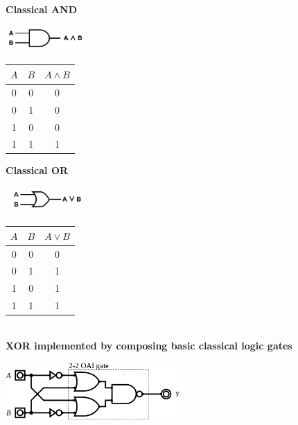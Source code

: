 \documentclass[conference]{IEEEtran}
\begin{document}
\begin{appendices}
\textbf{Classical AND}


\centerline{
    \includegraphics[width=0.225\textwidth]{img/classical-and-gate.png}
}
\label{fig:classicalAnd}

\begin{center}
\begin{tabular}{|c|c|c|}
    \hline
    $A$ & $B$ & $A \land B$ \\
    \hline
    0 & 0 & 0 \\
    0 & 1 & 0 \\
    1 & 0 & 0 \\
    1 & 1 & 1 \\
    \hline
\end{tabular}
\end{center}


\textbf{Classical OR}


\centerline{
    \includegraphics[width=0.225\textwidth]{img/classical-or-gate.png}
}
\label{fig:classicalOr}

\begin{center}
\begin{tabular}{|c|c|c|}
    \hline
    $A$ & $B$ & $A \lor B$ \\
    \hline
    0 & 0 & 0 \\
    0 & 1 & 1 \\
    1 & 0 & 1 \\
    1 & 1 & 1 \\
    \hline
\end{tabular}
\end{center} \ \\


\textbf{XOR implemented by composing basic classical logic gates} \ \\

\centerline{
    \includegraphics[width=0.5\textwidth]{img/XOR_gate_based_on_2-2_AOI_gate.svg.png}
}
\label{fig:logicalXORcircuit}


\end{appendices}
\end{document}
